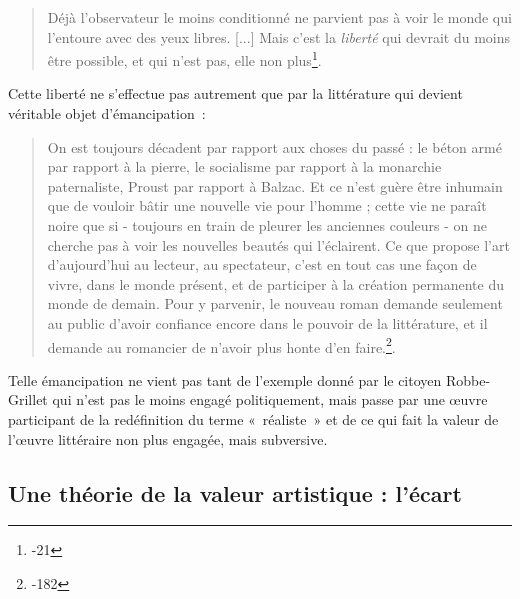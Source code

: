 \begin{quote}
    Déjà l'observateur le moins conditionné ne parvient pas à voir le monde qui l'entoure avec des yeux libres. [...] Mais c'est la \textit{liberté} qui devrait du moins être possible, et qui n'est pas, elle non plus\footnote{-21}.
\end{quote}
Cette liberté ne s'effectue pas autrement que par la littérature qui devient véritable objet d'émancipation~:
\begin{quote}
    On est toujours décadent par rapport aux choses du passé : le béton armé par rapport à la pierre, le socialisme par rapport à la monarchie paternaliste, Proust par rapport à Balzac. Et ce n'est guère être inhumain que de vouloir bâtir une nouvelle vie pour l'homme ; cette vie ne paraît noire que si - toujours en train de pleurer les anciennes couleurs - on ne cherche pas à voir les nouvelles beautés qui l'éclairent. Ce que propose l’art d’aujourd’hui au lecteur, au spectateur, c’est en tout cas une façon de vivre, dans le monde présent, et de participer à la création permanente du monde de demain. Pour y parvenir, le nouveau roman demande seulement au public d’avoir confiance encore dans le pouvoir de la littérature, et il demande au romancier de n’avoir plus honte d’en faire.\footnote{-182}.
\end{quote}

Telle émancipation ne vient pas tant de l'exemple donné par le citoyen Robbe-Grillet qui n'est pas le moins engagé politiquement, mais passe par une œuvre participant de la redéfinition du terme «~réaliste~» et de ce qui fait la valeur de l'œuvre littéraire non plus engagée, mais subversive.

\subsection{Une théorie de la valeur artistique : l'écart}
\label{theorie}

